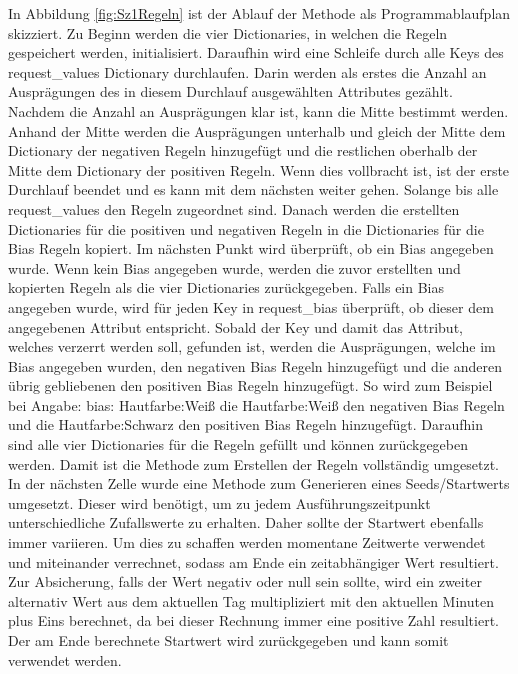 \begin{onehalfspace}
In Abbildung \ref{fig:Sz1Regeln} ist der Ablauf der Methode als Programmablaufplan skizziert. Zu Beginn werden die vier Dictionaries, in welchen die Regeln gespeichert werden, initialisiert. Daraufhin wird eine Schleife durch alle Keys des \glqq{}request\_values\grqq{} Dictionary durchlaufen. Darin werden als erstes die Anzahl an Ausprägungen des in diesem Durchlauf ausgewählten Attributes gezählt. Nachdem die Anzahl an Ausprägungen klar ist, kann die Mitte bestimmt werden. Anhand der Mitte werden die Ausprägungen unterhalb und gleich der Mitte dem Dictionary der negativen Regeln hinzugefügt und die restlichen oberhalb der Mitte dem Dictionary der positiven Regeln. Wenn dies vollbracht ist, ist der erste Durchlauf beendet und es kann mit dem nächsten weiter gehen. Solange bis alle \glqq{}request\_values\grqq{} den Regeln zugeordnet sind. Danach werden die erstellten Dictionaries für die positiven und negativen Regeln in die Dictionaries für die Bias Regeln kopiert.
Im nächsten Punkt wird überprüft, ob ein Bias angegeben wurde. Wenn kein Bias angegeben wurde, werden die zuvor erstellten und kopierten Regeln als die vier Dictionaries zurückgegeben. Falls ein Bias angegeben wurde, wird für jeden Key in \glqq{}request\_bias\grqq{} überprüft, ob dieser dem angegebenen Attribut entspricht. Sobald der Key und damit das Attribut, welches verzerrt werden soll, gefunden ist, werden die Ausprägungen, welche im Bias angegeben wurden, den negativen Bias Regeln hinzugefügt und die anderen übrig gebliebenen den positiven Bias Regeln hinzugefügt. So wird zum Beispiel bei Angabe: \glqq{}bias: Hautfarbe:Weiß\grqq{} die Hautfarbe:Weiß den negativen Bias Regeln und die Hautfarbe:Schwarz den positiven Bias Regeln hinzugefügt. Daraufhin sind alle vier Dictionaries für die Regeln gefüllt und können zurückgegeben werden.
Damit ist die Methode zum Erstellen der Regeln vollständig umgesetzt.
In der nächsten Zelle wurde eine Methode zum Generieren eines Seeds/Startwerts umgesetzt. Dieser wird benötigt, um zu jedem Ausführungszeitpunkt unterschiedliche Zufallswerte zu erhalten. Daher sollte der Startwert ebenfalls immer variieren. Um dies zu schaffen werden momentane Zeitwerte verwendet und miteinander verrechnet, sodass am Ende ein zeitabhängiger Wert resultiert. Zur Absicherung, falls der Wert negativ oder null sein sollte, wird ein zweiter alternativ Wert aus dem aktuellen Tag multipliziert mit den aktuellen Minuten plus Eins berechnet, da bei dieser Rechnung immer eine positive Zahl resultiert. Der am Ende berechnete Startwert wird zurückgegeben und kann somit verwendet werden.\\

\end{onehalfspace}
